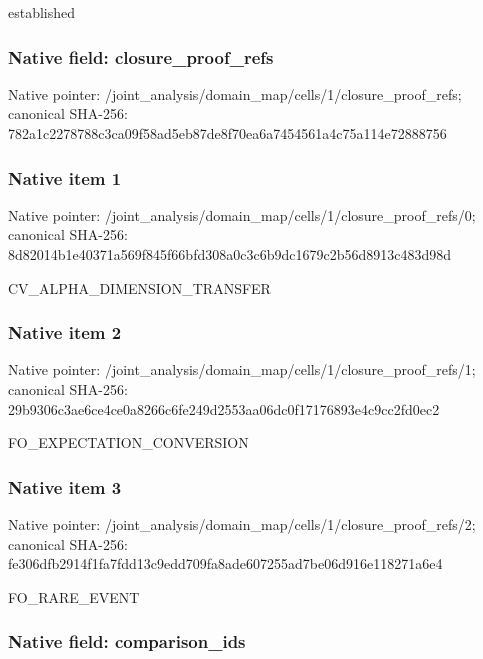 \documentclass[10pt,a4paper]{article}
\begin{document}
established


\subsubsection{Native field: closure\_proof\_refs}


Native pointer: /joint\_analysis/domain\_m\allowbreak{}ap/cells/1/closure\_proof\allowbreak{}\_refs; canonical SHA-256: 782a1c2278788c3ca09f58ad\allowbreak{}5eb87de8f70ea6a7454561a4\allowbreak{}c75a114e72888756



\subsubsection{Native item 1}


Native pointer: /joint\_analysis/domain\_m\allowbreak{}ap/cells/1/closure\_proof\allowbreak{}\_refs/0; canonical SHA-256: 8d82014b1e40371a569f845f\allowbreak{}66bfd308a0c3c6b9dc1679c2\allowbreak{}b56d8913c483d98d


CV\_ALPHA\_DIMENSION\_TRANSFER


\subsubsection{Native item 2}


Native pointer: /joint\_analysis/domain\_m\allowbreak{}ap/cells/1/closure\_proof\allowbreak{}\_refs/1; canonical SHA-256: 29b9306c3ae6ce4ce0a8266c\allowbreak{}6fe249d2553aa06dc0f17176\allowbreak{}893e4c9cc2fd0ec2


FO\_EXPECTATION\_CONVERSION


\subsubsection{Native item 3}


Native pointer: /joint\_analysis/domain\_m\allowbreak{}ap/cells/1/closure\_proof\allowbreak{}\_refs/2; canonical SHA-256: fe306dfb2914f1fa7fdd13c9\allowbreak{}edd709fa8ade607255ad7be0\allowbreak{}6d916e118271a6e4


FO\_RARE\_EVENT


\subsubsection{Native field: comparison\_ids}
\end{document}
